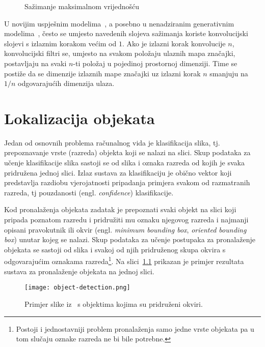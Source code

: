\documentclass[utf8, diplomski, numeric, lmodern]{fer}
\newcommand{\ilustracija}[1]{}
\begin{document}
\begin{figure}[htbp] \centering
	\ilustracija{max_pool}
	\caption{Sažimanje maksimalnom vrijednošću}
	\label{fig:max_pool}
\end{figure}

U novijim uspješnim modelima~\cite{resnet}, a posebno u nenadziranim generativnim modelima~\cite{gan}, često se umjesto navedenih slojeva sažimanja koriste konvolucijski slojevi s izlaznim korakom većim od $1$. Ako je izlazni korak konvolucije $n$, konvolucijski filtri se, umjesto na svakom položaju ulaznih mapa značajki, postavljaju na svaki $n$-ti položaj u pojedinoj prostornoj dimenziji. Time se postiže da se dimenzije izlaznih mape značajki uz izlazni korak $n$ smanjuju na $1/n$ odgovarajućih dimenzija ulaza.



\chapter{Lokalizacija objekata} \label{chap:detekcija}

Jedan od osnovnih problema računalnog vida je klasifikacija slika, tj. prepoznavanje vrste (razreda) objekta koji se nalazi na slici. Skup podataka za učenje klasifikacije slika sastoji se od slika i oznaka razreda od kojih je svaka pridružena jednoj slici. Izlaz sustava za klasifikaciju je obično vektor koji predstavlja razdiobu vjerojatnosti pripadanja primjera svakom od razmatranih razreda, tj pouzdanosti (engl. \emph{confidence}) klasifikacije.

Kod pronalaženja objekata zadatak je prepoznati svaki objekt na slici koji pripada poznatom razredu i pridružiti mu oznaku njegovog razreda i najmanji opisani pravokutnik ili okvir (engl. \emph{minimum bounding box}, \emph{oriented bounding box}) unutar kojeg se nalazi. Skup podataka za učenje postupaka za pronalaženje objekata se sastoji od slika i svakoj od njih pridruženog skupa okvira s odgovarajućim oznakama razreda\footnote{Postoji i jednostavniji problem pronalaženja samo jedne vrste objekata pa u tom slučaju oznake razreda ne bi bile potrebne.}. Na slici~\ref{fig:det-obj} prikazan je primjer rezultata sustava za pronalaženje objekata na jednoj slici.

\begin{figure}[htbp] \centering
	\texttt{[image: object-detection.png]}
	\caption{Primjer slike iz~\cite{yolo2web} s objektima kojima su pridruženi okviri.}
	\label{fig:det-obj}
\end{figure}
\end{document}

